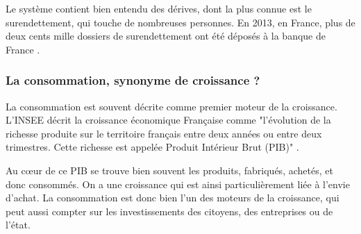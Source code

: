 Le système contient bien entendu des dérives, dont la plus connue est le surendettement, qui touche de nombreuses personnes. En 2013, en France, plus de deux cents mille dossiers de surendettement ont été déposés à la banque de France \cite{BanqueFranceEndettement}.


\subsubsection{La consommation, synonyme de croissance ?}
La consommation est souvent décrite comme premier moteur de la croissance. L'INSEE  décrit la croissance économique Française comme "l’évolution de la richesse produite sur le territoire français entre deux années ou entre deux trimestres. Cette richesse est appelée Produit Intérieur Brut (PIB)" \cite{INSEEcroissance}.

Au cœur de ce PIB se trouve bien souvent les produits, fabriqués, achetés, et donc consommés. On a une croissance qui est ainsi particulièrement liée à l'envie d'achat. La consommation est donc bien l'un des moteurs de la croissance, qui peut aussi compter sur les investissements des citoyens, des entreprises ou de l'état.


